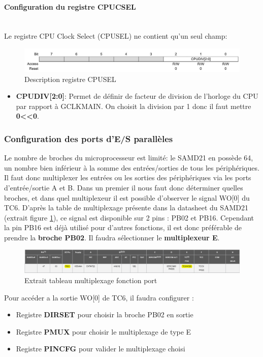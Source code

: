 \documentclass[a4paper]{article}
\begin{document}
	\paragraph{Configuration du registre CPUCSEL} 
	~~\\
	Le registre CPU Clock Select (CPUSEL) ne contient qu'un seul champ:
	\begin{figure}[H]
		\centering
		\includegraphics[width=0.9\linewidth]{CPUSEL.jpg}
		\caption{Description registre CPUSEL}
	\end{figure}
	\begin{itemize}
		\item {\bf CPUDIV[2:0]}: Permet de définir de facteur de division de l'horloge du CPU par rapport à GCLKMAIN. On choisit la division par 1 donc il faut mettre {\bf 0\textless\textless0}.~~\\
	\end{itemize}
	
	\subsubsection{Configuration des ports d'E/S parallèles} 
	Le nombre de broches du microprocesseur est limité: le SAMD21 en possède 64, un nombre bien inférieur à la somme des entrées/sorties de tous les périphériques. Il faut donc multiplexer les entrées ou les sorties des périphériques via les ports d’entrée/sortie A et B. Dans un premier il nous faut donc déterminer quelles broches, et dans quel multiplexeur il est possible d’observer le signal WO[0] du TC6. D’après la table de multiplexage présente dans la datasheet du SAMD21 (extrait figure \ref{fig:MUX_io}), ce signal est disponible sur 2 pins : PB02 et PB16. Cependant la pin PB16 est déjà utilisé pour d’autres fonctions, il est donc préférable de prendre la \textbf{broche PB02}. Il faudra sélectionner le \textbf{multiplexeur E}.
	\begin{figure}[H]
		\centering
		\includegraphics[width=\linewidth]{MUX_io}
		\caption{Extrait tableau multiplexage fonction port}
		\label{fig:MUX_io}
	\end{figure}
    Pour accéder a la sortie WO[0] de TC6, il faudra configurer :
    \begin{itemize}
		\item {Registre \bf DIRSET} pour choisir la broche PB02 en sortie
		\item {Registre \bf PMUX} pour choisir le multiplexage de type E
		\item {Registre \bf PINCFG} pour valider le multiplexage choisi
	\end{itemize}
	
\end{document}
